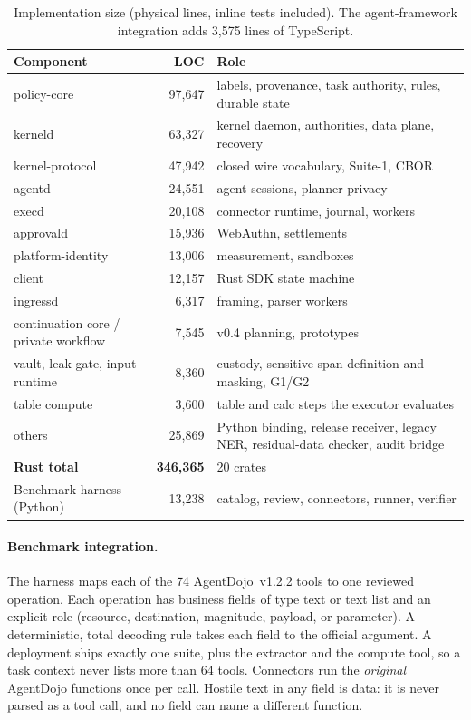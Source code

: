 \documentclass[letterpaper,twocolumn,10pt]{article}
\begin{document}
\begin{table}[t]
\centering\footnotesize
\begin{tabularx}{\columnwidth}{@{}lrX@{}}
\toprule
\textbf{Component} & \textbf{LOC} & \textbf{Role}\\
\midrule
policy-core & 97{,}647 & labels, provenance, task authority, rules, durable state\\
kerneld & 63{,}327 & kernel daemon, authorities, data plane, recovery\\
kernel-protocol & 47{,}942 & closed wire vocabulary, Suite-1, CBOR\\
agentd & 24{,}551 & agent sessions, planner privacy\\
execd & 20{,}108 & connector runtime, journal, workers\\
approvald & 15{,}936 & WebAuthn, settlements\\
platform-identity & 13{,}006 & measurement, sandboxes\\
client & 12{,}157 & Rust SDK state machine\\
ingressd & 6{,}317 & framing, parser workers\\
continuation core / private workflow & 7{,}545 & v0.4 planning, prototypes\\
vault, leak-gate, input-runtime & 8{,}360 & custody, sensitive-span definition and masking, G1/G2\\
table compute & 3{,}600 & table and calc steps the executor evaluates\\
others & 25{,}869 & Python binding, release receiver, legacy NER, residual-data checker, audit bridge\\
\midrule
\textbf{Rust total} & \textbf{346{,}365} & 20 crates\\
\midrule
Benchmark harness (Python) & 13{,}238 & catalog, review, connectors, runner, verifier\\
\bottomrule
\end{tabularx}
\caption{Implementation size (physical lines, inline tests included). The
agent-framework integration adds 3{,}575 lines of TypeScript.}
\label{tab:impl}
\end{table}

\paragraph{Benchmark integration.} The harness maps each of the 74
AgentDojo~v1.2.2 tools to one reviewed operation. Each operation has
business fields of type text or text list and an explicit role (resource,
destination, magnitude, payload, or parameter). A deterministic,
total decoding rule takes each field to the official argument. A
deployment ships exactly one suite, plus the extractor and the compute
tool, so a task context never lists more than 64 tools. Connectors run
the \emph{original} AgentDojo functions once per call. Hostile text in any
field is data: it is never parsed as a tool call, and no field can name a
different function.
\end{document}
